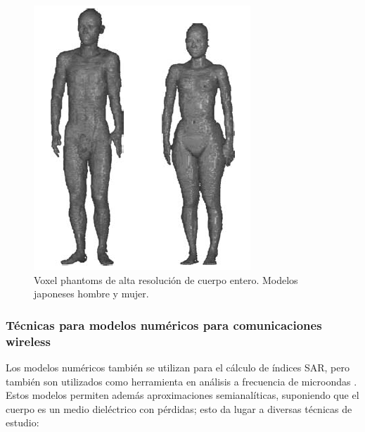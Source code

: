 \begin{figure}[!htb]
    \centering
    \includegraphics[scale=0.30]{./ContextoTecnologico/voxel_phantoms}
    \caption{Voxel phantoms de alta resolución de cuerpo entero. Modelos japoneses hombre y mujer. \cite{nagaoka}}
    \label{fig:fig3.4}
\end{figure}

\subsubsection{Técnicas para modelos numéricos para comunicaciones wireless}

Los modelos numéricos también se utilizan para el cálculo de índices SAR, pero también son utilizados como herramienta en análisis a frecuencia de microondas \cite{yang1}. Estos modelos permiten además aproximaciones semianalíticas, suponiendo que el cuerpo es un medio dieléctrico con pérdidas; esto da lugar a diversas técnicas de estudio:

